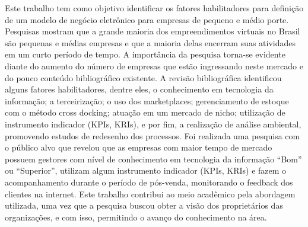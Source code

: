 
\begin{resumo} 
Este trabalho tem como objetivo identificar os fatores habilitadores para definição de um modelo de negócio eletrônico para empresas de pequeno e médio porte. Pesquisas mostram que a grande maioria dos empreendimentos virtuais no Brasil são pequenas e médias empresas e que a maioria delas encerram suas atividades em um curto período de tempo. A importância da pesquisa torna-se evidente diante do aumento do número de empresas que estão ingressando neste mercado e do pouco conteúdo bibliográfico existente. A revisão bibliográfica identificou alguns fatores habilitadores, dentre eles, o conhecimento em tecnologia da informação; a terceirização; o uso dos marketplaces; gerenciamento de estoque com o método cross docking; atuação em um mercado de nicho; utilização de instrumento indicador (KPIs, KRIs), e por fim, a realização de análise ambiental, promovendo estudos de redesenho dos processos. Foi realizada uma pesquisa com o público alvo que revelou que as empresas com maior tempo de mercado possuem gestores com nível de conhecimento em tecnologia da informação “Bom” ou “Superior”, utilizam algum instrumento indicador (KPIs, KRIs) e fazem o acompanhamento durante o período de pós-venda, monitorando o feedback dos clientes na internet. Este trabalho contribui ao meio acadêmico pela abordagem utilizada, uma vez que a pesquisa buscou obter a visão dos proprietários das organizações, e com isso, permitindo o avanço do conhecimento na área.
\end{resumo}

